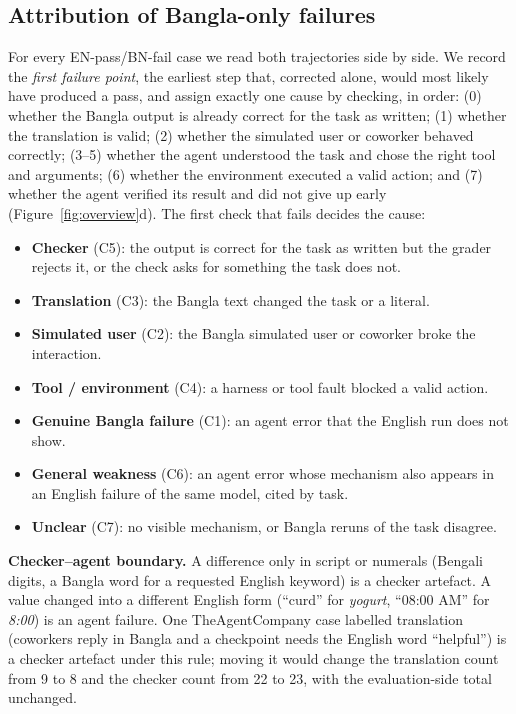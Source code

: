 \documentclass[11pt]{article}
\newcommand{\TAC}{TheAgentCompany}
\begin{document}
\subsection{Attribution of Bangla-only failures}
\label{sec:attribution}
For every EN-pass/BN-fail case we read both trajectories side by side. We record the \emph{first
failure point}, the earliest step that, corrected alone, would most likely have produced a pass,
and assign exactly one cause by checking, in order: (0) whether the Bangla output is already
correct for the task as written; (1) whether the translation is valid; (2) whether the simulated
user or coworker behaved correctly; (3--5) whether the agent understood the task and chose the
right tool and arguments; (6) whether the environment executed a valid action; and (7) whether the
agent verified its result and did not give up early (Figure~\ref{fig:overview}d). The first check
that fails decides the cause:

\begin{itemize}[noitemsep,topsep=1pt,leftmargin=*]
\item \textbf{Checker} (C5): the output is correct for the task as written but the grader rejects
it, or the check asks for something the task does not.
\item \textbf{Translation} (C3): the Bangla text changed the task or a literal.
\item \textbf{Simulated user} (C2): the Bangla simulated user or coworker broke the interaction.
\item \textbf{Tool / environment} (C4): a harness or tool fault blocked a valid action.
\item \textbf{Genuine Bangla failure} (C1): an agent error that the English run does not show.
\item \textbf{General weakness} (C6): an agent error whose mechanism also appears in an English
failure of the same model, cited by task.
\item \textbf{Unclear} (C7): no visible mechanism, or Bangla reruns of the task disagree.
\end{itemize}

\noindent \textbf{Checker--agent boundary.} A difference only in script or numerals (Bengali
digits, a Bangla word for a requested English keyword) is a checker artefact. A value changed into a
different English form (``curd'' for \emph{yogurt}, ``08:00 AM'' for \emph{8:00}) is an agent
failure. One \TAC{} case labelled translation (coworkers reply in Bangla and a checkpoint needs the
English word ``helpful'') is a checker artefact under this rule; moving it would change the
translation count from 9 to 8 and the checker count from 22 to 23, with the evaluation-side total
unchanged.
\end{document}
